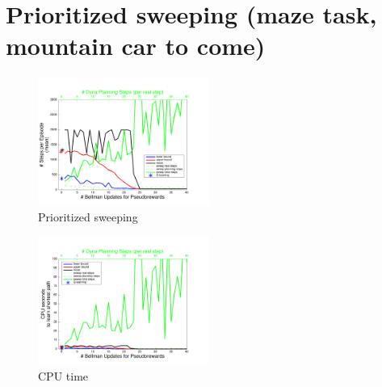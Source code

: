 \documentclass[letterpaper]{article}
\begin{document}
\pagebreak

\section{Prioritized sweeping (maze task, mountain car to come)}

\begin{figure}[ht]
\centering
\includegraphics[width=0.5\textwidth]{learning_vs_PRiterationsSweeping_DYNA_mean}
\caption{Prioritized sweeping}
\label{fig:S3a}
\end{figure}

\begin{figure}[ht]
\centering
\includegraphics[width=0.5\textwidth]{cpus_vs_PRiterations_sweeping_toGoal}
\caption{CPU time}
\label{fig:S3b}
\end{figure}
\end{document}

